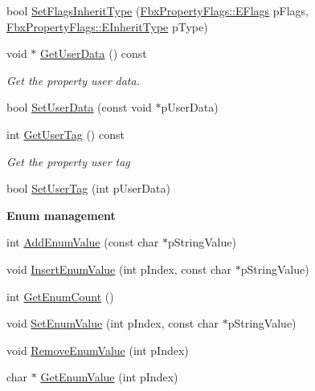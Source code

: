 \begin{Indent}
\begin{DoxyCompactItemize}
\item 
bool \hyperlink{class_fbx_property_handle_af26f5ca742328a6894bd89ae80ef9c86}{Set\+Flags\+Inherit\+Type} (\hyperlink{class_fbx_property_flags_afabfa7e0949aac8a7dcdf8a141867e99}{Fbx\+Property\+Flags\+::\+E\+Flags} p\+Flags, \hyperlink{class_fbx_property_flags_ae3b667a4fcac4b827fa186a698fec2f8}{Fbx\+Property\+Flags\+::\+E\+Inherit\+Type} p\+Type)
\item 
void $\ast$ \hyperlink{class_fbx_property_handle_a6e6c699c0fc80977bb746198e41708cd}{Get\+User\+Data} () const
\begin{DoxyCompactList}\small\item\em Get the property user data. \end{DoxyCompactList}\item 
bool \hyperlink{class_fbx_property_handle_ac8ae1291fa5e34f1eb1373a42e8245c8}{Set\+User\+Data} (const void $\ast$p\+User\+Data)
\item 
int \hyperlink{class_fbx_property_handle_a9ce046fde2818e1e90782fea7b3294c9}{Get\+User\+Tag} () const
\begin{DoxyCompactList}\small\item\em Get the property user tag \end{DoxyCompactList}\item 
bool \hyperlink{class_fbx_property_handle_a41eff619689a61cf283d9913429a6221}{Set\+User\+Tag} (int p\+User\+Data)
\end{DoxyCompactItemize}
\end{Indent}
\begin{Indent}\textbf{ Enum management}\par
\begin{DoxyCompactItemize}
\item 
int \hyperlink{class_fbx_property_handle_acae1f5d8ca9ae53a6a926179913bea07}{Add\+Enum\+Value} (const char $\ast$p\+String\+Value)
\item 
void \hyperlink{class_fbx_property_handle_ab7e634de872eec9ff5fa59e88a000f79}{Insert\+Enum\+Value} (int p\+Index, const char $\ast$p\+String\+Value)
\item 
int \hyperlink{class_fbx_property_handle_a2402b4e7a56046ebb4f1b941a447b197}{Get\+Enum\+Count} ()
\item 
void \hyperlink{class_fbx_property_handle_aa558ce3c342afbf4331fa941dc4fcd32}{Set\+Enum\+Value} (int p\+Index, const char $\ast$p\+String\+Value)
\item 
void \hyperlink{class_fbx_property_handle_ad57e9833aa4c0815954b0a87d1c83fae}{Remove\+Enum\+Value} (int p\+Index)
\item 
char $\ast$ \hyperlink{class_fbx_property_handle_a0c80a68745b75cb46ca742603506f75b}{Get\+Enum\+Value} (int p\+Index)
\end{DoxyCompactItemize}
\end{Indent}

